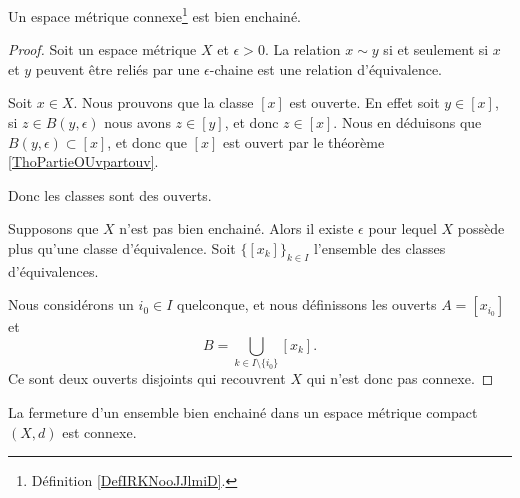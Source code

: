 \begin{proposition}       \label{PROPooBUNOooIvfugn}
	Un espace métrique connexe\footnote{Définition \ref{DefIRKNooJJlmiD}.} est bien enchainé.
\end{proposition}

\begin{proof}
	Soit un espace métrique \( X\) et \( \epsilon>0\). La relation \( x\sim y\) si et seulement si \( x\) et \( y\) peuvent être reliés par une \( \epsilon\)-chaine est une relation d'équivalence.

	Soit \( x\in X\). Nous prouvons que la classe \( [x]\) est ouverte. En effet soit \( y\in [x]\), si \( z\in B(y,\epsilon)\) nous avons \( z\in [y]\), et donc \( z\in [x]\). Nous en déduisons que \( B(y,\epsilon)\subset [x]\), et donc que \( [x]\) est ouvert par le théorème \ref{ThoPartieOUvpartouv}.

	Donc les classes sont des ouverts.

	Supposons que \( X\) n'est pas bien enchainé. Alors il existe \( \epsilon\) pour lequel \( X\) possède plus qu'une classe d'équivalence. Soit \( \{ [x_k] \}_{k\in I}\) l'ensemble des classes d'équivalences.

	Nous considérons un \( i_0\in I\) quelconque, et nous définissons les ouverts \( A=[x_{i_0}]\) et
	\begin{equation}
		B=\bigcup_{k\in I\setminus\{ i_0 \}}[x_k].
	\end{equation}
	Ce sont deux ouverts disjoints qui recouvrent \( X\) qui n'est donc pas connexe.
\end{proof}

\begin{proposition}     \label{PROPooXHTWooZibddZ}
	La fermeture d'un ensemble bien enchainé dans un espace métrique compact \( (X,d)\) est connexe.
\end{proposition}

